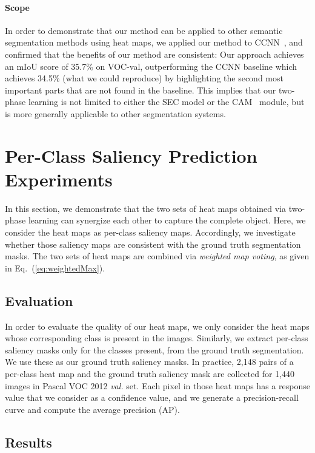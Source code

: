 \documentclass[10pt,twocolumn,letterpaper]{article}
\newcommand{\eqnref}[1]{Eq.~(\ref{#1})}
\begin{document}
\paragraph{Scope}\quad
In order to demonstrate that our method can be applied to other semantic segmentation methods using heat maps, we applied our method to CCNN~\cite{pathakICCV15ccnn}, and confirmed that the benefits of our method are consistent: Our approach achieves an mIoU score of 35.7\% on VOC-val, outperforming the CCNN baseline which achieves 34.5\% (what we could reproduce) by highlighting the second most important parts that are not found in the baseline. This implies that our two-phase learning is not limited to either the SEC model or the CAM~\cite{zhou2016cvpr} module, but is more generally applicable to other segmentation systems.

\section{Per-Class Saliency Prediction Experiments}

\label{sec:saliency}
In this section, we demonstrate that the two sets of heat maps obtained via two-phase learning can synergize each other to capture the complete object. Here, we consider the heat maps as per-class saliency maps. Accordingly, we investigate whether those saliency maps are consistent with the ground truth segmentation masks. The two sets of heat maps are combined via \textit{weighted map voting}, as given in \eqnref{eq:weightedMax}.



\subsection{Evaluation}

In order to evaluate the quality of our heat maps, we only consider the heat maps whose corresponding class is present in the images. Similarly, we extract per-class saliency masks only for the classes present, from the ground truth segmentation. We use these as our ground truth saliency masks. In practice, 2,148 pairs of a per-class heat map and the ground truth saliency mask are collected for 1,440 images in Pascal VOC 2012 \textit{val.} set. Each pixel in those heat maps has a response value that we consider as a confidence value, and we generate a precision-recall curve and compute the average precision (AP).

\subsection{Results}
\end{document}
